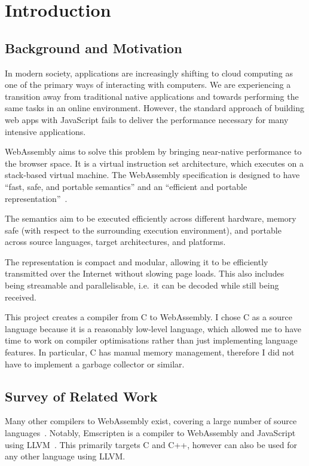 \documentclass[00-main.tex]{subfiles}
\begin{document}
\chapter{Introduction}

\section{Background and Motivation}

In modern society, applications are increasingly shifting to cloud computing as one of the primary ways of interacting with computers.
We are experiencing a transition away from traditional native applications and towards performing the same tasks in an online environment.
However, the standard approach of building web apps with JavaScript fails to deliver the performance necessary for many intensive applications.

WebAssembly aims to solve this problem by bringing near-native performance to the browser space.
It is a virtual instruction set architecture, which executes on a stack-based virtual machine.
The WebAssembly specification is designed to have ``fast, safe, and portable semantics'' and an ``efficient and portable representation''~.

The semantics aim to be executed efficiently across different hardware, memory safe (with respect to the surrounding execution environment), and portable across source languages, target architectures, and platforms.

The representation is compact and modular, allowing it to be efficiently transmitted over the Internet without slowing page loads.
This also includes being streamable and parallelisable, i.e.~it can be decoded while still being received.

This project creates a compiler from C to WebAssembly.
I chose C as a source language because it is a reasonably low-level language, which allowed me to have time to work on compiler optimisations rather than just implementing language features.
In particular, C has manual memory management, therefore I did not have to implement a garbage collector or similar.


\section{Survey of Related Work}

Many other compilers to WebAssembly exist, covering a large number of source languages~.
Notably, Emscripten is a compiler to WebAssembly and JavaScript using LLVM~.
This primarily targets C and C++, however can also be used for any other language using LLVM\@.
\end{document}
